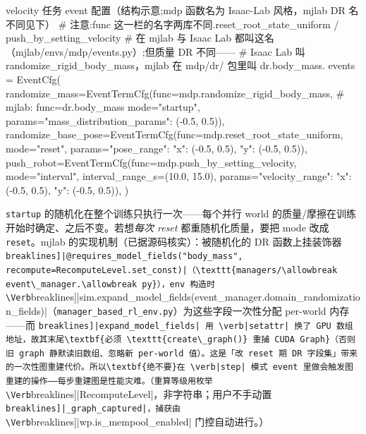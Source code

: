 \begin{codebox}[Python]{velocity 任务 event 配置（结构示意;mdp 函数名为 Isaac-Lab 风格，mjlab DR 名不同见下）}
# 注意:func 这一栏的名字两库不同.reset_root_state_uniform / push_by_setting_velocity
# 在 mjlab 与 Isaac Lab 都叫这名（mjlab/envs/mdp/events.py）;但质量 DR 不同——
# Isaac Lab 叫 randomize_rigid_body_mass，mjlab 在 mdp/dr/ 包里叫 dr.body_mass.
events = EventCfg(
    randomize_mass=EventTermCfg(func=mdp.randomize_rigid_body_mass,  # mjlab: func=dr.body_mass
        mode="startup", params={"mass_distribution_params": (-0.5, 0.5)}),
    randomize_base_pose=EventTermCfg(func=mdp.reset_root_state_uniform,
        mode="reset", params={"pose_range": {"x": (-0.5, 0.5), "y": (-0.5, 0.5)}}),
    push_robot=EventTermCfg(func=mdp.push_by_setting_velocity,
        mode="interval", interval_range_s=(10.0, 15.0),
        params={"velocity_range": {"x": (-0.5, 0.5), "y": (-0.5, 0.5)}}),
)
\end{codebox}

\begin{insight}\label{ins:rlmc-mgr-startup}
\verb|startup| 的随机化在整个训练只执行一次——每个并行 world 的质量/摩擦在训练开始时确定、之后不变。若想\emph{每次 reset} 都重随机化质量，要把 mode 改成 \verb|reset|。mjlab 的实现机制（已据源码核实）：被随机化的 DR 函数上挂装饰器 \Verb[breaklines]|@requires_model_fields("body_mass", recompute=RecomputeLevel.set_const)|（\texttt{managers/\allowbreak event\_manager.\allowbreak py}），env 构造时 \Verb[breaklines]|sim.expand_model_fields(event_manager.domain_randomization_fields)|（\texttt{manager\_based\_rl\_env.\allowbreak py}）为这些字段一次性分配 per-world 内存——而 \Verb[breaklines]|expand_model_fields| 用 \verb|setattr| 换了 GPU 数组地址，故其末尾\textbf{必须 \texttt{create\_graph()} 重捕 CUDA Graph}（否则旧 graph 静默读旧数组、忽略新 per-world 值）。这是「改 reset 期 DR 字段集」带来的一次性图重建代价。所以\textbf{绝不要}在 \verb|step| 模式 event 里做会触发图重建的操作——每步重建图是性能灾难。（重算等级用枚举 \Verb[breaklines]|RecomputeLevel|，非字符串；用户不手动置 \Verb[breaklines]|_graph_captured|，捕获由 \Verb[breaklines]|wp.is_mempool_enabled| 门控自动进行。）
\end{insight}

